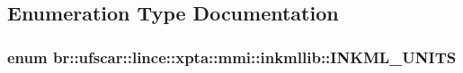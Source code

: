 \subsection{Enumeration Type Documentation}
\hypertarget{namespacebr_1_1ufscar_1_1lince_1_1xpta_1_1mmi_1_1inkmllib_aa20053e417f8d2a79fcdc702e3e23673}{
\subsubsection[{INKML\_\-UNITS}]{\setlength{\rightskip}{0pt plus 5cm}enum {\bf br::ufscar::lince::xpta::mmi::inkmllib::INKML\_\-UNITS}}}
\label{namespacebr_1_1ufscar_1_1lince_1_1xpta_1_1mmi_1_1inkmllib_aa20053e417f8d2a79fcdc702e3e23673}
